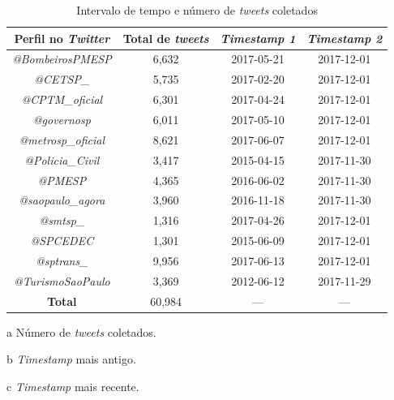 \documentclass[
	12pt,				%
	oneside,			%
	a4paper,			%
	english,			%
	brazil				%
	]{abntex2ppgsi}
\begin{document}
{{{\begin{table}[!htb]
\centering
\caption{Intervalo de tempo e número de \textit{tweets} coletados}
	\label{tab:tweetsCollected}
\begin{threeparttable}
\begin{tabular}{c|c|c|c}
\toprule
\textbf {Perfil no \textit{Twitter}} &\textbf{Total de \textit{tweets}\tnote{a}}  &\textbf{ \textit{Timestamp 1\tnote{b}}} & \textbf{\textit{Timestamp 2\tnote{c}}} \\ 
\midrule
\textit{@BombeirosPMESP} & 6,632 & 2017-05-21 & 2017-12-01 \\
\hline
\textit{@CETSP\_} & 5,735 & 2017-02-20  & 2017-12-01 \\
\hline
\textit{@CPTM\_oficial} & 6,301 & 2017-04-24 & 2017-12-01 \\
\hline
\textit{@governosp}  & 6,011 & 2017-05-10 & 2017-12-01 \\
\hline
\textit{@metrosp\_oficial} & 8,621 & 2017-06-07 & 2017-12-01 \\
\hline
\textit{@Policia\_Civil}  & 3,417 & 2015-04-15 & 2017-11-30 \\
\hline
\textit{@PMESP}  & 4,365 & 2016-06-02 & 2017-11-30 \\
\hline
\textit{@saopaulo\_agora}  & 3,960 & 2016-11-18 & 2017-11-30 \\
\hline
\textit{@smtsp\_} & 1,316 & 2017-04-26 & 2017-12-01 \\
\hline
\textit{@SPCEDEC} & 1,301 & 2015-06-09 & 2017-12-01 \\
\hline
\textit{@sptrans\_} & 9,956 & 2017-06-13 & 2017-12-01 \\
\hline
\textit{@TurismoSaoPaulo} & 3,369 & 2012-06-12 & 2017-11-29 \\
\midrule
\midrule
\textbf{Total} & 60,984 & --- & --- \\
\bottomrule
\end{tabular}
\begin{tablenotes}
            \item[a] Número de \textit{tweets} coletados.
            \item[b] \textit{Timestamp} mais antigo.
            \item[c] \textit{Timestamp} mais recente.
        \end{tablenotes}
\end{threeparttable}
\end{table}

\clearpage

}}}
\end{document}
